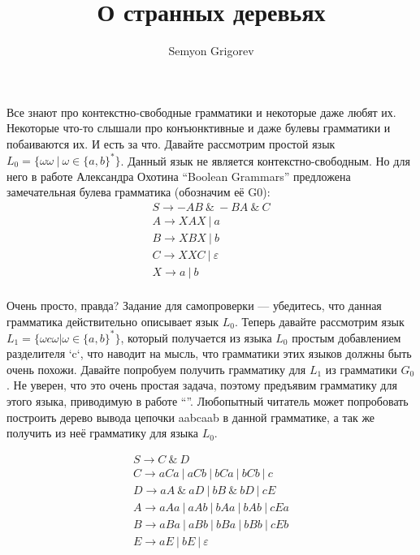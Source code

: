 \documentclass[12pt]{article}  %
\title{О странных деревьях}
\author{Semyon Grigorev}
\theoremstyle{definition}
\theoremstyle{remark}
\begin{document}
\maketitle

Все знают про контекстно-свободные грамматики и некоторые даже любят их.
Некоторые что-то слышали про конъюнктивные и даже булевы грамматики и побаиваются их.
И есть за что. 
Давайте рассмотрим простой язык $L_0 = \{\omega \omega \ | \ \omega \in \{a,b\}^*\}$. Данный язык не является контекстно-свободным. Но для него в работе Александра Охотина “Boolean Grammars” предложена замечательная булева грамматика (обозначим её G0):
$$
\begin{array}{l}
S \rightarrow  -A B \ \& \ -B A \ \& \ C \\
A \rightarrow  X A X \ | \ a  \\
B \rightarrow  X B X \ | \ b  \\
C \rightarrow  X X C \ | \ \varepsilon \\
X \rightarrow  a \ | \ b  \\
\end{array}
$$

Очень просто, правда? 
Задание для самопроверки — убедитесь, что данная грамматика действительно описывает язык $L_0$.
Теперь давайте рассмотрим язык $L_1 = \{\omega c \omega | \omega \in \{a,b\}^*\}$, который получается из языка $L_0$ простым добавлением разделителя `c`, что наводит на мысль, что грамматики этих языков должны быть очень похожи.
Давайте попробуем получить грамматику для $L_1$ из грамматики $G_0$.
Не уверен, что это очень простая задача, поэтому предъявим грамматику для этого языка, приводимую в работе “”. 
Любопытный читатель может попробовать построить дерево вывода цепочки aabcaab в данной грамматике, а так же получить из неё грамматику для языка $L_0$. 

$$
\begin{array}{l}
S \rightarrow C \ \& \ D \\
C \rightarrow a C a \ | \ a C b \ | \ b C a \ | \ b C b \ | \ c  \\
D \rightarrow a A \ \& \ a D \ | \ b B \ \& \ b D \ | \ c E  \\
A \rightarrow a A a \ | \ a A b \ | \ b A a \ | \ b A b \ | \ c E a  \\
B \rightarrow a B a \ | \ a B b \ | \ b B a \ | \ b B b \ | \ c E b \\
E \rightarrow a E \ | \ b E \ | \ \varepsilon                \\
\end{array}
$$
\end{document}
